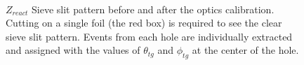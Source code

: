 \begin{figure}[!ht]
  \begin{center}
    \\
    \caption[Sieve slit pattern before and after the optics calibration]{\footnotesize{$Z_{react}$ Sieve slit pattern before and after the optics calibration. Cutting on a single foil (the red box) is required to see the clear sieve slit pattern. Events from each hole are individually extracted and assigned with the values of $\theta_{tg}$ and $\phi_{tg}$ at the center of the hole.} }
    \label{optics_sieve}
  \end{center}
\end{figure}

